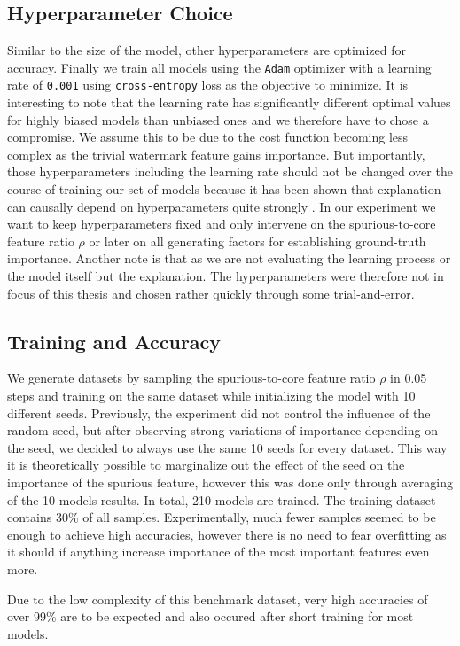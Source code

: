 \subsection{Hyperparameter Choice}
Similar to the size of the model, other hyperparameters are optimized for accuracy.
Finally we train all models using the \verb|Adam| optimizer  with a learning rate of \verb|0.001| using \verb|cross-entropy| loss  as the objective to minimize.
It is interesting to note that the learning rate has significantly different optimal values for highly biased models than unbiased ones and we therefore have to chose a compromise. We assume this to be due to the cost function becoming less complex as the trivial watermark feature gains importance.
But importantly, those hyperparameters including the learning rate should not be changed over the course of training our set of models because it has been shown that explanation can causally depend on hyperparameters quite strongly \cite{Karimi2023}. In our experiment we want to keep hyperparameters fixed and only intervene on the spurious-to-core feature ratio $\rho$ or later on all generating factors for establishing ground-truth importance. Another note is that as we are not evaluating the learning process or the model itself but the explanation. The hyperparameters were therefore not in focus of this thesis and chosen rather quickly through some trial-and-error.

\subsection{Training and Accuracy}
We generate datasets by sampling the spurious-to-core feature ratio $\rho$ in 0.05 steps and training on the same dataset while initializing the model with 10 different seeds.
Previously, the experiment did not control the influence of the random seed, but after observing strong variations of importance depending on the seed, we decided to always use the same 10 seeds for every dataset. This way it is theoretically possible to marginalize out the effect of the seed on the importance of the spurious feature, however this was done only through averaging of the 10 models results.
In total, 210 models are trained. The training dataset contains 30\% of all samples. Experimentally, much fewer samples seemed to be enough to achieve high accuracies, however there is no need to fear overfitting as it should if anything increase importance of the most important features even more.

Due to the low complexity of this benchmark dataset, very high accuracies of over 99\% are to be expected and also occured after short training for most models.

